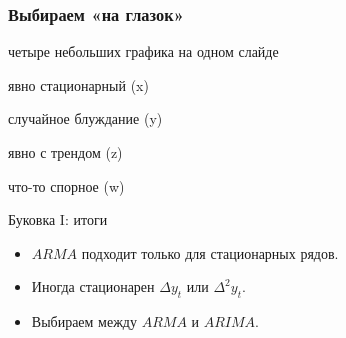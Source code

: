 \begin{frame}
  \frametitle{Выбираем «на глазок»}

  четыре небольших графика на одном слайде

  явно стационарный (x)

  случайное блуждание (y)

  явно с трендом (z)

  что-то спорное (w)
  
\end{frame}



\begin{frame}{Буковка I: итоги}

  \begin{itemize}[<+->]
    \item $ARMA$ подходит только для \alert{стационарных} рядов. 
    \item Иногда стационарен $\Delta y_t$ или $\Delta^2 y_t$. 
    \item Выбираем между $ARMA$ и $ARIMA$.
  \end{itemize}
\end{frame}

